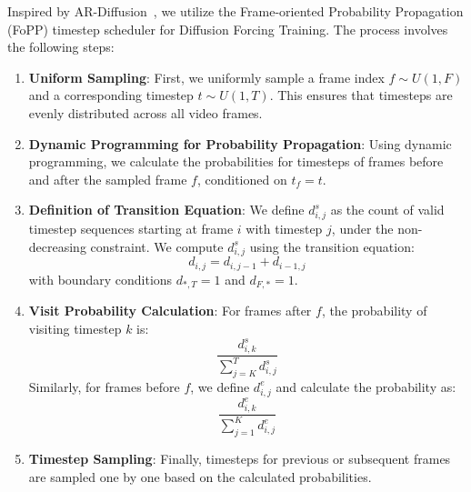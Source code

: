 \documentclass{article}
\begin{document}
{Inspired by AR-Diffusion~\cite{sun2025ar}, we utilize the Frame-oriented Probability Propagation (FoPP) timestep scheduler for Diffusion Forcing Training. The process involves the following steps:

\begin{enumerate}
    \item \textbf{Uniform Sampling}: First, we uniformly sample a frame index \( f \sim U(1, F) \) and a corresponding timestep \( t \sim U(1, T) \). This ensures that timesteps are evenly distributed across all video frames.
    
    \item \textbf{Dynamic Programming for Probability Propagation}: Using dynamic programming, we calculate the probabilities for timesteps of frames before and after the sampled frame \( f \), conditioned on \( t_f = t \).
    
    \item \textbf{Definition of Transition Equation}: We define \( d^s_{i,j} \) as the count of valid timestep sequences starting at frame \( i \) with timestep \( j \), under the non-decreasing constraint. We compute \( d^s_{i,j} \) using the transition equation:
    \[
    d_{i,j} = d_{i,j-1} + d_{i-1,j}
    \]
    with boundary conditions \( d_{*, T} = 1 \) and \( d_{F, *} = 1 \).
    
    \item \textbf{Visit Probability Calculation}: For frames after \( f \), the probability of visiting timestep \( k \) is:
    \[
    \frac{d^s_{i,k}}{\sum_{j=K}^T d^s_{i,j}}
    \]
    Similarly, for frames before \( f \), we define \( d^e_{i,j} \) and calculate the probability as:
    \[
    \frac{d^e_{i,k}}{\sum_{j=1}^K d^e_{i,j}}
    \]
    
    \item \textbf{Timestep Sampling}: Finally, timesteps for previous or subsequent frames are sampled one by one based on the calculated probabilities.
\end{enumerate}


}
\end{document}
